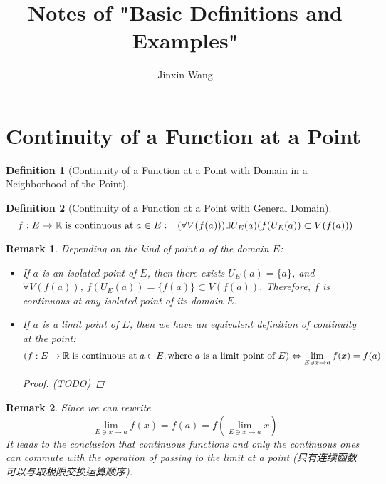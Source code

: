 \documentclass[onecolumn]{ctexart}
\title{Notes of "Basic Definitions and Examples"}
\author{Jinxin Wang}
\date{}
\newtheorem{definition}{Definition}
\newtheorem{remark}{Remark}
\begin{document}
\maketitle

\section{Continuity of a Function at a Point}

\begin{definition}[Continuity of a Function at a Point with Domain in a Neighborhood of the Point]
  
\end{definition}

\begin{definition}[Continuity of a Function at a Point with General Domain]
  \[
    f:E \to \mathbb{R} \thickspace \textnormal{is continuous at} \thickspace a \in E := 
    (\forall V(f(a))) \exists U_E(a) (f(U_E(a)) \subset V(f(a)))
  \]
\end{definition}
\begin{remark}
  Depending on the kind of point $a$ of the domain $E$:
  \begin{itemize}
    \item If $a$ is an isolated point of $E$, then there exists $U_E(a) = 
    \lbrace a \rbrace$, and $\forall V(f(a))$, $f(U_E(a)) = \lbrace f(a) \rbrace 
    \subset V(f(a))$. Therefore, $f$ is continuous at any isolated point of its 
    domain $E$.
    \item If $a$ is a limit point of $E$, then we have an equivalent definition 
    of continuity at the point:
    \begin{equation}
      (f:E \to \mathbb{R} \thickspace \textnormal{is continuous at} \thickspace 
      a \in E, \textnormal{where $a$ is a limit point of $E$}) \Leftrightarrow \lim_{E \owns x \to a} f(x) = f(a)
    \end{equation}
    \begin{proof}
      (TODO)
    \end{proof}
  \end{itemize}
\end{remark}
\begin{remark}
  Since we can rewrite
  \begin{equation}
    \lim_{E \owns x \to a} f(x) = f(a) = f(\lim_{E \owns x \to a} x)
  \end{equation}
  It leads to the conclusion that continuous functions and only the continuous 
  ones can commute with the operation of passing to the limit at a point (只有连续函数可以与取极限交换运算顺序).
\end{remark}
\end{document}

